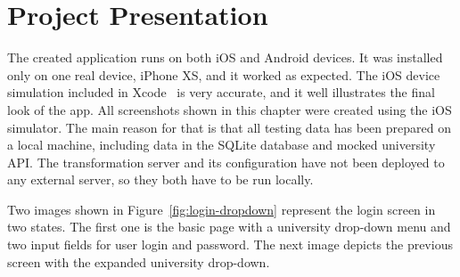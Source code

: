 \chapter{Project Presentation}
The created application runs on both iOS and Android devices. It was installed only on one real device, iPhone XS, and it worked as expected. The iOS device simulation included in Xcode~\cite{xcode} is very accurate, and it well illustrates the final look of the app. All screenshots shown in this chapter were created using the iOS simulator. The main reason for that is that all testing data has been prepared on a local machine, including data in the SQLite database and mocked university API. The transformation server and its configuration have not been deployed to any external server, so they both have to be run locally.

Two images shown in Figure~\ref{fig:login-dropdown} represent the login screen in two states. The first one is the basic page with a university drop-down menu and two input fields for user login and password. The next image depicts the previous screen with the expanded university drop-down.

